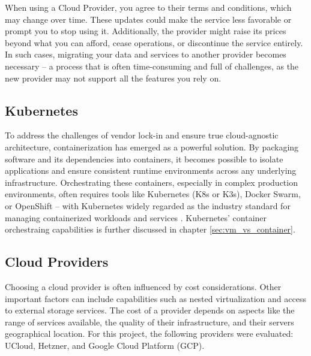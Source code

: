 When using a Cloud Provider, you agree to their terms and conditions, which may change over time. These updates could make the service less favorable or prompt you to stop using it. Additionally, the provider might raise its prices beyond what you can afford, cease operations, or discontinue the service entirely. In such cases, migrating your data and services to another provider becomes necessary -- a process that is often time-consuming and full of challenges, as the new provider may not support all the features you rely on.

\subsection{Kubernetes}

To address the challenges of vendor lock-in and ensure true cloud-agnostic architecture, containerization has emerged as a powerful solution. By packaging software and its dependencies into containers, it becomes possible to isolate applications and ensure consistent runtime environments across any underlying infrastructure. Orchestrating these containers, especially in complex production environments, often requires tools like Kubernetes (K8s or K3s), Docker Swarm, or OpenShift -- with Kubernetes widely regarded as the industry standard for managing containerized workloads and services \Parencite{opsramp_kubernetes_origin}. Kubernetes' container orchestraing capabilities is further discussed in chapter \ref{sec:vm_vs_container}.

\subsection{Cloud Providers}

Choosing a cloud provider is often influenced by cost considerations. Other important factors can include capabilities such as nested virtualization and access to external storage services. The cost of a provider depends on aspects like the range of services available, the quality of their infrastructure, and their servers geographical location. For this project, the following providers were evaluated: UCloud, Hetzner, and Google Cloud Platform (GCP).

